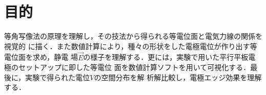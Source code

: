 
\section{目的}

等角写像法の原理を理解し，その技法から得られる等電位面と電気力線の関係を視覚的
に描く．また数値計算により，種々の形状をした電極電位が作り出す等電位面を求め，静電
場$\vec{E}$の様子を理解する．更には，実験で用いた平行平板電極のセットアップに即した等電位
面を数値計算ソフトを用いて可視化する．最後に，実験で得られた電位$V$の空間分布を解
析解比較し，電極エッジ効果を理解する．
